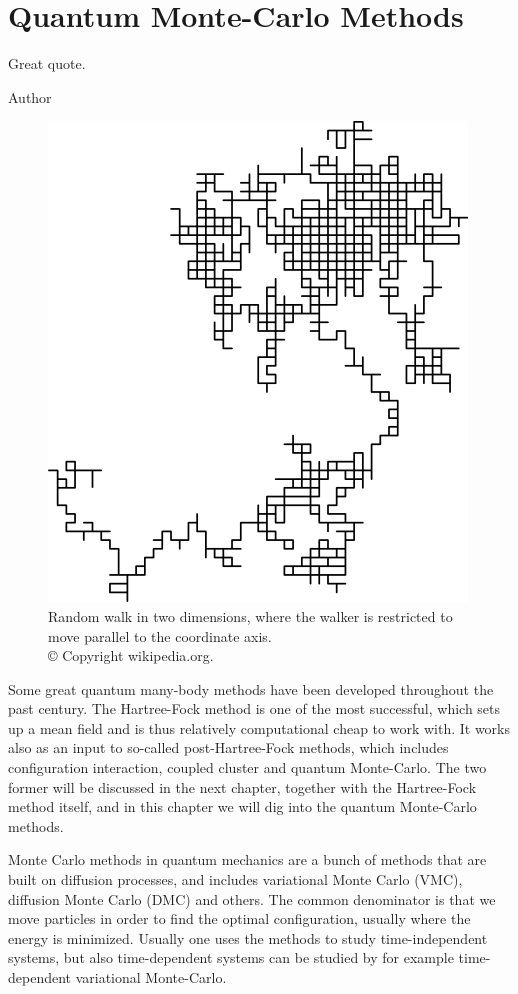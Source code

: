 \chapter{Quantum Monte-Carlo Methods} \label{chp:methods}
\epigraph{Great quote.}{Author}
\begin{figure}[H]
	\centering
	\includegraphics[scale=0.4]{Images/random_walk.png}
	\caption{Random walk in two dimensions, where the walker is restricted to move parallel to the coordinate axis.\\ © Copyright wikipedia.org.}
\end{figure}

Some great quantum many-body methods have been developed throughout the past century. The Hartree-Fock method is one of the most successful, which sets up a mean field and is thus relatively computational cheap to work with. It works also as an input to so-called post-Hartree-Fock methods, which includes configuration interaction, coupled cluster and quantum Monte-Carlo. The two former will be discussed in the next chapter, together with the Hartree-Fock method itself, and in this chapter we will dig into the quantum Monte-Carlo methods. 

Monte Carlo methods in quantum mechanics are a bunch of methods that are built on diffusion processes, and includes variational Monte Carlo (VMC), diffusion Monte Carlo (DMC) and others. The common denominator is that we move particles in order to find the optimal configuration, usually where the energy is minimized. Usually one uses the methods to study time-independent systems, but also time-dependent systems can be studied by for example time-dependent variational Monte-Carlo.

